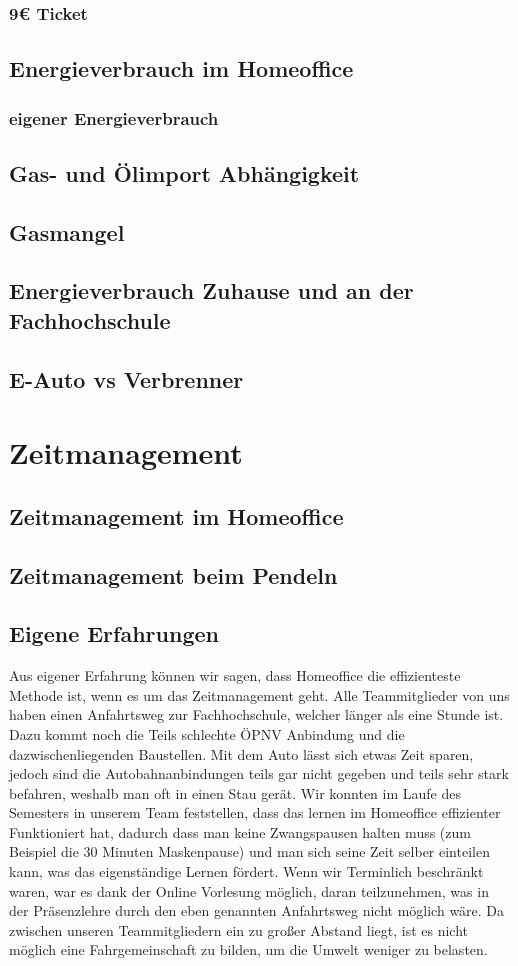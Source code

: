 \documentclass[a4paper,12pt]{scrartcl}
\begin{document}
\subsubsection{9€ Ticket}
\subsection{Energieverbrauch im Homeoffice}
\subsubsection{eigener Energieverbrauch}
\subsection{Gas- und Ölimport Abhängigkeit}
\subsection{Gasmangel}
\subsection{Energieverbrauch Zuhause und an der Fachhochschule}
\subsection{E-Auto vs Verbrenner}

\section{Zeitmanagement}
\subsection{Zeitmanagement im Homeoffice}
\subsection{Zeitmanagement beim Pendeln}
\subsection{Eigene Erfahrungen}
Aus eigener Erfahrung können wir sagen, dass Homeoffice die effizienteste Methode ist, wenn es um das Zeitmanagement geht. Alle Teammitglieder von uns haben einen Anfahrtsweg zur Fachhochschule, welcher länger als eine Stunde ist. Dazu kommt noch die Teils schlechte ÖPNV Anbindung und die dazwischenliegenden Baustellen. Mit dem Auto lässt sich etwas Zeit sparen, jedoch sind die Autobahnanbindungen teils gar nicht gegeben und teils sehr stark befahren, weshalb man oft in einen Stau gerät. Wir konnten im Laufe des Semesters in unserem Team feststellen, dass das lernen im Homeoffice effizienter Funktioniert hat, dadurch dass man keine Zwangspausen halten muss (zum Beispiel die 30 Minuten Maskenpause) und man sich seine Zeit selber einteilen kann, was das eigenständige Lernen fördert. Wenn wir Terminlich beschränkt waren, war es dank der Online Vorlesung möglich, daran teilzunehmen, was in der Präsenzlehre durch den eben genannten Anfahrtsweg nicht möglich wäre. Da zwischen unseren Teammitgliedern ein zu großer Abstand liegt, ist es nicht möglich eine Fahrgemeinschaft zu bilden, um die Umwelt weniger zu belasten.
\end{document}
